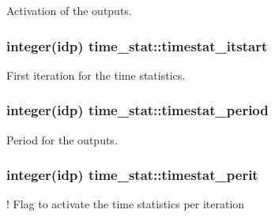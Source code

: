 Activation of the outputs. 

\subsubsection[{\texorpdfstring{timestat\+\_\+itstart}{timestat_itstart}}]{\setlength{\rightskip}{0pt plus 5cm}integer(idp) time\+\_\+stat\+::timestat\+\_\+itstart}\hypertarget{namespacetime__stat_acb480c360afa0c963ea37a4a3b0cbb88}{}\label{namespacetime__stat_acb480c360afa0c963ea37a4a3b0cbb88}


First iteration for the time statistics. 

\subsubsection[{\texorpdfstring{timestat\+\_\+period}{timestat_period}}]{\setlength{\rightskip}{0pt plus 5cm}integer(idp) time\+\_\+stat\+::timestat\+\_\+period}\hypertarget{namespacetime__stat_ab14608304df879ee0678f16685c5d61e}{}\label{namespacetime__stat_ab14608304df879ee0678f16685c5d61e}


Period for the outputs. 

\subsubsection[{\texorpdfstring{timestat\+\_\+perit}{timestat_perit}}]{\setlength{\rightskip}{0pt plus 5cm}integer(idp) time\+\_\+stat\+::timestat\+\_\+perit}\hypertarget{namespacetime__stat_ad186476b25a6b961d4149313b0fc6657}{}\label{namespacetime__stat_ad186476b25a6b961d4149313b0fc6657}


! Flag to activate the time statistics per iteration 

